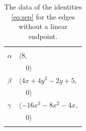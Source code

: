 \documentclass[11pt]{article}
\begin{document}
\begingroup\scriptsize
\setlength{\LTcapwidth}{\textwidth}
\begin{longtable}{@{}ll@{}}
\caption{The data of the identities \eqref{eq:sep} for the edges without a linear endpoint.}\label{tab:bez}\\
\hline\endfirsthead\hline\endhead\hline\endfoot
\multicolumn{2}{@{}l}{$(i,j)=(19,46)$, $D_{ij}=\langle 3,0\rangle$}\\
$\alpha$ & $\langle 8,$\\
 & $\quad 0\rangle$\\
$\beta$ & $\langle 4x+4y^{2}-2y+5,$\\
 & $\quad 0\rangle$\\
$\gamma$ & $\langle -16x^{3}-8x^{2}-4x,$\\
 & $\quad 0\rangle$\\
\addlinespace[2pt]
\end{longtable}
\endgroup
\end{document}

